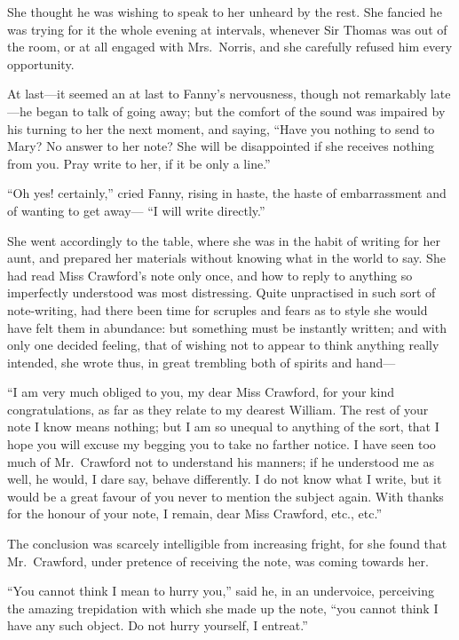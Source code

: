 \documentclass{article}
\begin{document}
She thought he was wishing to speak to her unheard
by the rest.  She fancied he was trying for it the
whole evening at intervals, whenever Sir Thomas was
out of the room, or at all engaged with Mrs.\ Norris,
and she carefully refused him every opportunity.

At last---it seemed an at last to Fanny's nervousness,
though not remarkably late---he began to talk of going away;
but the comfort of the sound was impaired by his turning
to her the next moment, and saying, ``Have you nothing to send
to Mary?  No answer to her note?  She will be disappointed
if she receives nothing from you.  Pray write to her,
if it be only a line.''

``Oh yes! certainly,'' cried Fanny, rising in haste,
the haste of embarrassment and of wanting to get away---%
``I will write directly.''

She went accordingly to the table, where she was in the
habit of writing for her aunt, and prepared her materials
without knowing what in the world to say.  She had read
Miss Crawford's note only once, and how to reply to
anything so imperfectly understood was most distressing.
Quite unpractised in such sort of note-writing, had
there been time for scruples and fears as to style she
would have felt them in abundance:  but something must
be instantly written; and with only one decided feeling,
that of wishing not to appear to think anything really intended,
she wrote thus, in great trembling both of spirits and hand---%

``I am very much obliged to you, my dear Miss Crawford,
for your kind congratulations, as far as they relate to my
dearest William.  The rest of your note I know means nothing;
but I am so unequal to anything of the sort, that I hope
you will excuse my begging you to take no farther notice.
I have seen too much of Mr.\ Crawford not to understand
his manners; if he understood me as well, he would,
I dare say, behave differently.  I do not know what I write,
but it would be a great favour of you never to mention
the subject again.  With thanks for the honour of your note,
I remain, dear Miss Crawford, etc., etc.''

The conclusion was scarcely intelligible from increasing
fright, for she found that Mr.\ Crawford, under pretence
of receiving the note, was coming towards her.

``You cannot think I mean to hurry you,'' said he,
in an undervoice, perceiving the amazing trepidation
with which she made up the note, ``you cannot think
I have any such object.  Do not hurry yourself, I entreat.''
\end{document}

